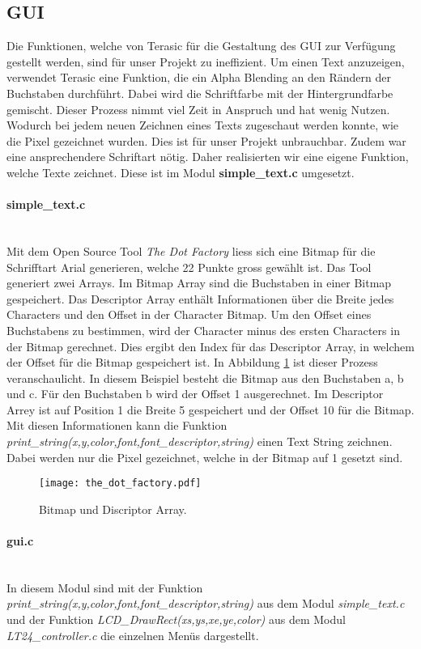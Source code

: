 \subsection{GUI}\label{subsec:gui}
Die Funktionen, welche von Terasic für die Gestaltung des GUI zur Verfügung gestellt werden, sind für unser Projekt zu ineffizient. Um einen Text anzuzeigen, verwendet Terasic eine Funktion, die ein Alpha Blending an den Rändern der Buchstaben durchführt. Dabei wird die Schriftfarbe mit der Hintergrundfarbe gemischt. Dieser Prozess nimmt viel Zeit in Anspruch und hat wenig Nutzen. Wodurch bei jedem neuen Zeichnen eines Texts zugeschaut werden konnte, wie die Pixel gezeichnet wurden. Dies ist für unser Projekt unbrauchbar. Zudem war eine ansprechendere Schriftart nötig. Daher realisierten wir eine eigene Funktion, welche Texte zeichnet. Diese ist im Modul \textbf{simple\_text.c} umgesetzt.
\newpage
\paragraph{simple\_text.c}\mbox{}\\

Mit dem Open Source Tool \textit{The Dot Factory} liess sich eine Bitmap für die Schrifftart Arial generieren, welche 22 Punkte gross gewählt ist. Das Tool generiert zwei Arrays. Im Bitmap Array sind die Buchstaben in einer Bitmap gespeichert. Das Descriptor Array enthält Informationen über die Breite jedes Characters und den Offset in der Character Bitmap. Um den Offset eines Buchstabens zu bestimmen, wird der Character minus des ersten Characters in der Bitmap gerechnet. Dies ergibt den Index für das Descriptor Array, in welchem der Offset für die Bitmap gespeichert ist. In Abbildung \ref{img:bitmap} ist dieser Prozess veranschaulicht. In diesem Beispiel besteht die Bitmap aus den Buchstaben a, b und c. Für den Buchstaben b wird der Offset 1 ausgerechnet. Im Descriptor Arrey ist auf Position 1 die Breite 5 gespeichert und der Offset 10 für die Bitmap. Mit diesen Informationen kann die Funktion \textit{print\_string(x,y,color,font,font\_descriptor,string)} einen Text String zeichnen. Dabei werden nur die Pixel gezeichnet, welche in der Bitmap auf 1 gesetzt sind.

\begin{figure}[h]
	\centering
	\texttt{[image: the\_dot\_factory.pdf]}
	\caption{Bitmap und Discriptor Array.}
	\label{img:bitmap}
\end{figure}

\newpage
\paragraph{gui.c} \mbox{}\\

In diesem Modul sind mit der Funktion \textit{print\_string(x,y,color,font,font\_descriptor,string)} aus dem Modul  \textit{simple\_text.c} und der Funktion \textit{LCD\_DrawRect(xs,ys,xe,ye,color)} aus dem Modul \textit{LT24\_controller.c} die einzelnen Menüs dargestellt. 